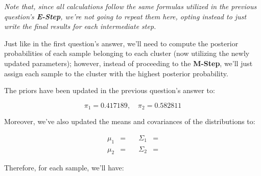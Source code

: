 \documentclass[12pt]{article}
\begin{document}
\begin{enumerate}[leftmargin=\labelsep]
\begin{enumerate}[leftmargin=\labelsep]
                \textit{Note that, since all calculations follow the same formulas utilized
                  in the previous question's \textbf{E-Step}, we're not going to repeat them here,
                  opting instead to just write the final results for each intermediate step.}

                Just like in the first question's answer, we'll need to compute the posterior
                probabilities of each sample belonging to each cluster (now utilizing the newly updated
                parameters); however, instead of proceeding to the \textbf{M-Step}, we'll just assign
                each sample to the cluster with the highest posterior probability.

                The priors have been updated in the previous question's answer to:

                \begin{equation*}
                  \pi_1 = 0.417189, \quad
                  \pi_2 = 0.582811
                \end{equation*}

                Moreover, we've also updated the means and covariances of the distributions
                to:

                \begin{equation*}
                  \begin{aligned}
                    \mu_1 & =        \quad
                          & \Sigma_1                                             & =  \\
                    \mu_2 & =  \quad
                          & \Sigma_2                                             & = 
                  \end{aligned}
                \end{equation*}


                Therefore, for each sample, we'll have:

                \vspace*{0.5cm}

                \begin{paracol}{3}
                  \setlength{\columnseprule}{1pt}
                  \def\columnseprulecolor{\color{black}}
                  \centering


\end{paracol}
\end{enumerate}
\end{enumerate}
\end{document}
